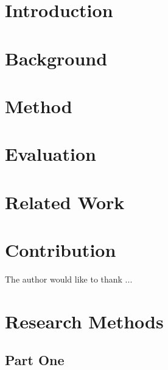 \documentclass[manuscript,review,screen,nonacm,sigplan]{acmart}
\begin{document}
\maketitle

\section{Introduction}
\section{Background}
\section{Method}
\section{Evaluation}
\section{Related Work}
\section{Contribution}

\begin{acks}
  The author would like to thank ...
\end{acks}





\appendix

\section{Research Methods}

\subsection{Part One}
\end{document}
